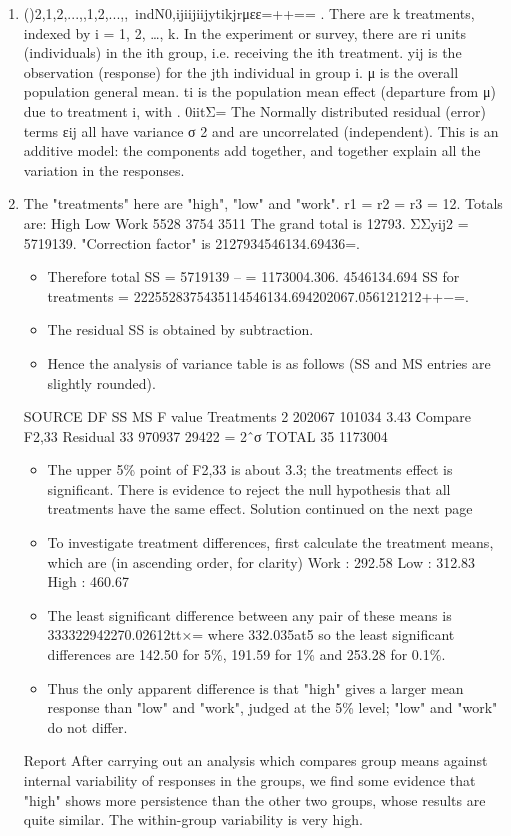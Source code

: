 \documentclass[a4paper,12pt]{article}
\begin{document}
\begin{enumerate}
\item {}()2,1,2,...,,1,2,...,,~indN0,ijiijiijytikjrμεε=++== .
There are k treatments, indexed by i = 1, 2, …, k. In the experiment or survey, there are ri units (individuals) in the ith group, i.e. receiving the ith treatment. yij is the observation (response) for the jth individual in group i.
μ is the overall population general mean. ti is the population mean effect (departure from μ) due to treatment i, with . 0iitΣ=
The Normally distributed residual (error) terms εij all have variance σ 2 and are uncorrelated (independent).
This is an additive model: the components add together, and together explain all the variation in the responses.
\item The "treatments" here are "high", "low" and "work". r1 = r2 = r3 = 12.
Totals are:
High
Low
Work
5528
3754
3511
The grand total is 12793. ΣΣyij2 = 5719139.
"Correction factor" is 2127934546134.69436=.
\begin{itemize}
    \item Therefore total SS = 5719139 – = 1173004.306. 4546134.694
SS for treatments = 2225528375435114546134.694202067.056121212++−=.
    \item The residual SS is obtained by subtraction.
    \item Hence the analysis of variance table is as follows (SS and MS entries are slightly rounded).
\end{itemize}

SOURCE
DF
SS
MS
F value
Treatments
2
202067
101034
3.43 Compare F2,33
Residual
33
970937
29422
= 2ˆσ
TOTAL
35
1173004
\begin{itemize}
\item The upper 5\% point of F2,33 is about 3.3; the treatments effect is significant. There is evidence to reject the null hypothesis that all treatments have the same effect.
Solution continued on the next page
\item To investigate treatment differences, first calculate the treatment means, which are (in ascending order, for clarity)
Work : 292.58 Low : 312.83 High : 460.67
\item The least significant difference between any pair of these means is
333322942270.02612tt×= where 332.035at5%
so the least significant differences are 142.50 for 5\%, 191.59 for 1\% and 253.28 for 0.1\%. 
\item Thus the only apparent difference is that "high" gives a larger mean response than "low" and "work", judged at the 5\% level; "low" and "work" do not differ.
\end{itemize}

\begin{framed}
Report
After carrying out an analysis which compares group means against internal variability of responses in the groups, we find some evidence that "high" shows more persistence than the other two groups, whose results are quite similar. The within-group variability is very high.
\end{framed}
\end{enumerate}
\end{document}

